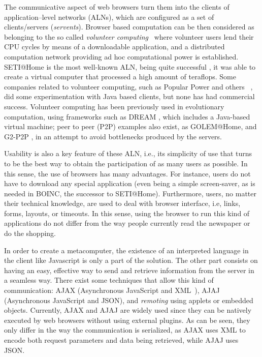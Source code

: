 \documentclass[runningheads,a4paper]{llncs}
\begin{document}
The communicative aspect of web browsers turn them into the clients of application--level networks (ALNs), which are configured as a set of
clients/servers ({\em servents}). Browser based computation can be then considered as belonging to the so called  {\em volunteer computing}~\cite{sarmenta-bayanihan,hpvc} where volunteer users lend their CPU cycles by means of a downloadable application, and a distributed computation network providing ad hoc computational power is established. SETI@Home is the most well-known ALN, being quite successful \cite{david-seti:home}, it was able to	
create a virtual computer that processed a high amount of
teraflops.  Some companies related to volunteer computing, such as Popular Power and
others ~\cite{Cappello}, did some experimentation with Java based
clients, but none has had commercial success. Volunteer computing has
been previously used in evolutionary computation, using
frameworks such as DREAM \cite{LNCS2439:ID197:pp665}, which includes a
Java-based virtual machine; peer to peer (P2P) examples also exist, as  GOLEM@Home, and G2-P2P \cite{G2-P2P}, in an attempt to avoid bottlenecks produced by the servers.


Usability is also a key feature of these ALN, i.e., its simplicity
of use that turns to be the best way to obtain the participation of as
many users as possible. In this sense, the use of browsers has many advantages. For instance, users do not have to download any special application (even being a simple screen-saver, as is needed in BOINC, the successor to SETI@Home). Furthermore, users, no matter their technical knowledge, are used to deal with browser interface, i.e, links, forms, layouts, or timeouts. In this sense, using the browser to run this kind of applications do not differ from the way people currently read the newspaper or do the shopping.

In order to create a metacomputer, the existence of an interpreted language in the client like Javascript is only a part of the solution. The other part consists on having an easy, effective way to send and retrieve information from the server in a seamless way. There exist some techniques that allow this kind of communication: AJAX (Asynchronous JavaScript and
XML~\cite{brinzarea2010ajax}), AJAJ (Asynchronous JavaScript and JSON), and {\em remoting} using
applets or embedded objects. Currently, AJAX and AJAJ are widely used since they can be natively executed by web browsers without using external plugins. As can be seen, they only differ in the way the communication is serialized, as AJAX uses XML\cite{goldberg2009xml} to encode both request parameters and data being retrieved, while AJAJ uses JSON. 
\end{document}
